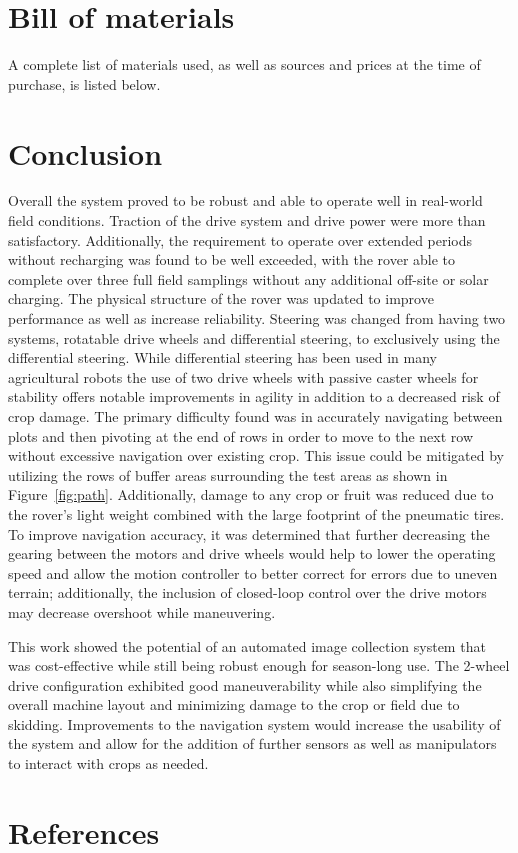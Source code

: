 \section {Bill of materials}

A complete list of materials used, as well as sources and prices at the time of purchase, is listed below.



\newpage


\section{Conclusion}

Overall the system proved to be robust and able to operate well in real-world field conditions. Traction of the drive system and drive power were more than satisfactory. Additionally, the requirement to operate over extended periods without recharging was found to be well exceeded, with the rover able to complete over three full field samplings without any additional off-site or solar charging. The physical structure of the rover was updated to improve performance as well as increase reliability. Steering was changed from having two systems, rotatable drive wheels and differential steering, to exclusively using the differential steering. While differential steering has been used in many agricultural robots \cite{veiros_multitask_2022} the use of two drive wheels with passive caster wheels for stability offers notable improvements in agility in addition to a decreased risk of crop damage. The primary difficulty found was in accurately navigating between plots and then pivoting at the end of rows in order to move to the next row without excessive navigation over existing crop. This issue could be mitigated by utilizing the rows of buffer areas surrounding the test areas as shown in Figure~\ref{fig:path}. Additionally, damage to any crop or fruit was reduced due to the rover's light weight combined with the large footprint of the pneumatic tires. To improve navigation accuracy, it was determined that further decreasing the gearing between the motors and drive wheels would help to lower the operating speed and allow the motion controller to better correct for errors due to uneven terrain; additionally, the inclusion of closed-loop control over the drive motors may decrease overshoot while maneuvering.

This work showed the potential of an automated image collection system that was cost-effective while still being robust enough for season-long use. The 2-wheel drive configuration exhibited good maneuverability while also simplifying the overall machine layout and minimizing damage to the crop or field due to skidding.  Improvements to the navigation system would increase the usability of the system and allow for the addition of further sensors as well as manipulators to interact with crops as needed.

\newpage

\section{References}

\printbibliography[heading=none]

